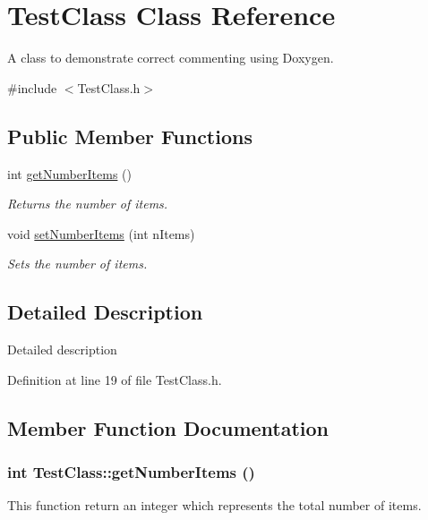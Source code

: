 \hypertarget{class_test_class}{
\section{TestClass Class Reference}
\label{class_test_class}
}


A class to demonstrate correct commenting using Doxygen.  




{\ttfamily \#include $<$TestClass.h$>$}

\subsection*{Public Member Functions}
\begin{DoxyCompactItemize}
\item 
int \hyperlink{class_test_class_a23d5146b20a69343ce595804d74d0075}{getNumberItems} ()
\begin{DoxyCompactList}\small\item\em Returns the number of items. \item\end{DoxyCompactList}\item 
void \hyperlink{class_test_class_ad0423c0877ebf6531514b14fa8683bea}{setNumberItems} (int nItems)
\begin{DoxyCompactList}\small\item\em Sets the number of items. \item\end{DoxyCompactList}\end{DoxyCompactItemize}


\subsection{Detailed Description}
Detailed description 

Definition at line 19 of file TestClass.h.



\subsection{Member Function Documentation}
\hypertarget{class_test_class_a23d5146b20a69343ce595804d74d0075}{
\subsubsection[{getNumberItems}]{\setlength{\rightskip}{0pt plus 5cm}int TestClass::getNumberItems ()}}
\label{class_test_class_a23d5146b20a69343ce595804d74d0075}
This function return an integer which represents the total number of items.

